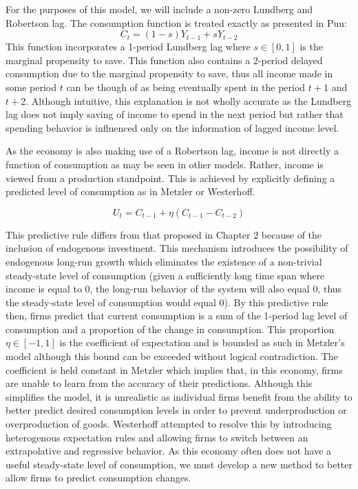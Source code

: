 For the purposes of this model, we will include a non-zero Lundberg and Robertson lag. The consumption function is treated exactly as presented in Puu:
\begin{equation}
    C_t=(1-s)Y_{t-1}+sY_{t-2}
\end{equation}
This function incorporates a 1-period Lundberg lag where $s\in[0,1]$ is the marginal propensity to save. This function also contains a 2-period delayed consumption due to the marginal propensity to save, thus all income made in some period $t$ can be though of as being eventually spent in the period $t+1$ and $t+2$. Although intuitive, this explanation is not wholly accurate as the Lundberg lag does not imply saving of income to spend in the next period but rather that spending behavior is influenced only on the information of lagged income level. 

As the economy is also making use of a Robertson lag, income is not directly a function of consumption as may be seen in other models. Rather, income is viewed from a production standpoint. This is achieved by explicitly defining a predicted level of consumption as in Metzler or Westerhoff. 

\begin{equation} \label{eq:predict}
    U_t=C_{t-1}+\eta(C_{t-1}-C_{t-2})
\end{equation}

This predictive rule differs from that proposed in Chapter 2 because of the inclusion of endogenous investment. This mechanism introduces the possibility of endogenous long-run growth which eliminates the existence of a non-trivial steady-state level of consumption (given a sufficiently long time span where income is equal to 0, the long-run behavior of the system will also equal 0, thus the steady-state level of consumption would equal 0). By this predictive rule then, firms predict that current consumption is a sum of the 1-period lag level of consumption and a proportion of the change in consumption. This proportion $\eta\in[-1,1]$ is the coefficient of expectation and is bounded as such in Metzler's model although this bound can be exceeded without logical contradiction. The coefficient is held constant in Metzler which implies that, in this economy, firms are unable to learn from the accuracy of their predictions. Although this simplifies the model, it is unrealistic as individual firms benefit from the ability to better predict desired consumption levels in order to prevent underproduction or overproduction of goods. Westerhoff attempted to resolve this by introducing heterogenous expectation rules and allowing firms to switch between an extrapolative and regressive behavior. As this economy often does not have a useful steady-state level of consumption, we must develop a new method to better allow firms to predict consumption changes.

